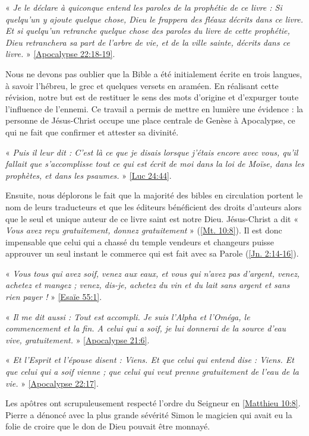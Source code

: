 « \emph{Je le déclare à quiconque entend les paroles de la prophétie de ce livre : Si quelqu'un y ajoute quelque chose, Dieu le frappera des fléaux décrits dans ce livre. Et si quelqu'un retranche quelque chose des paroles du livre de cette prophétie, Dieu retranchera sa part de l'arbre de vie, et de la ville sainte, décrits dans ce livre.} » \vref{Apocalypse 22:18-19}.

Nous ne devons pas oublier que la Bible a été initialement écrite en trois langues, à savoir l'hébreu, le grec et quelques versets en araméen. En réalisant cette révision, notre but est de restituer le sens des mots d'origine et d'expurger toute l'influence de l'ennemi. Ce travail a permis de mettre en lumière une évidence : la personne de Jésus-Christ occupe une place centrale de Genèse à Apocalypse, ce qui ne fait que confirmer et attester sa divinité.

« \emph{Puis il leur dit : C'est là ce que je disais lorsque j'étais encore avec vous, qu'il fallait que s'accomplisse tout ce qui est écrit de moi dans la loi de Moïse, dans les prophètes, et dans les psaumes.} » \vref{Luc 24:44}.

Ensuite, nous déplorons le fait que la majorité des bibles en circulation portent le nom de leurs traducteurs et que les éditeurs bénéficient des droits d'auteurs alors que le seul et unique auteur de ce livre saint est notre Dieu. Jésus-Christ a dit « \emph{Vous avez reçu gratuitement, donnez gratuitement} » (\vref{Mt. 10:8}). Il est donc impensable que celui qui a chassé du temple vendeurs et changeurs puisse approuver un seul instant le commerce qui est fait avec sa Parole (\vref{Jn. 2:14-16}).

« \emph{Vous tous qui avez soif, venez aux eaux, et vous qui n'avez pas d'argent, venez, achetez et mangez ; venez, dis-je, achetez du vin et du lait sans argent et sans rien payer !} » \vref{Esaïe 55:1}.

« \emph{Il me dit aussi : Tout est accompli. Je suis l'Alpha et l'Oméga, le commencement et la fin. A celui qui a soif, je lui donnerai de la source d'eau vive, gratuitement.} » \vref{Apocalypse 21:6}.

« \emph{Et l'Esprit et l'épouse disent : Viens. Et que celui qui entend dise : Viens. Et que celui qui a soif vienne ; que celui qui veut prenne gratuitement de l'eau de la vie.} » \vref{Apocalypse 22:17}.

Les apôtres ont scrupuleusement respecté l'ordre du Seigneur en \vref{Matthieu 10:8}. Pierre a dénoncé avec la plus grande sévérité Simon le magicien qui avait eu la folie de croire que le don de Dieu pouvait être monnayé. 

